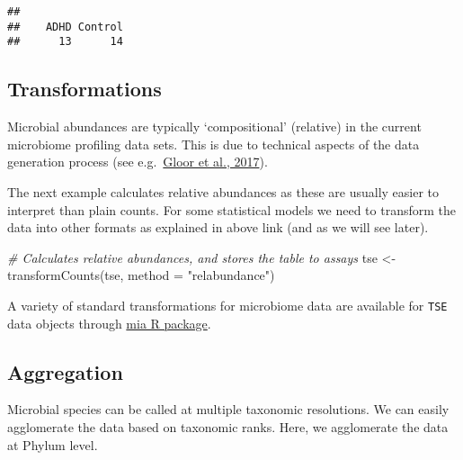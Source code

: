 \documentclass[
  oneside]{book}
\newenvironment{Shaded}{\begin{snugshade}}{\end{snugshade}}
\newcommand{\AttributeTok}[1]{\textcolor[rgb]{0.77,0.63,0.00}{#1}}
\newcommand{\CommentTok}[1]{\textcolor[rgb]{0.56,0.35,0.01}{\textit{#1}}}
\newcommand{\FunctionTok}[1]{\textcolor[rgb]{0.00,0.00,0.00}{#1}}
\newcommand{\NormalTok}[1]{#1}
\newcommand{\OtherTok}[1]{\textcolor[rgb]{0.56,0.35,0.01}{#1}}
\newcommand{\SpecialCharTok}[1]{\textcolor[rgb]{0.00,0.00,0.00}{#1}}
\newcommand{\StringTok}[1]{\textcolor[rgb]{0.31,0.60,0.02}{#1}}
\begin{document}
\begin{Shaded}
\end{Shaded}

\begin{verbatim}
## 
##    ADHD Control 
##      13      14
\end{verbatim}

\hypertarget{transformations}{%
\subsection{Transformations}\label{transformations}}

Microbial abundances are typically `compositional' (relative) in the
current microbiome profiling data sets. This is due to technical
aspects of the data generation process (see e.g.~\href{https://www.frontiersin.org/articles/10.3389/fmicb.2017.02224/full}{Gloor et al.,
2017}).

The next example calculates relative abundances as these are usually easier to
interpret than plain counts. For some statistical models we need to
transform the data into other formats as explained in above link (and
as we will see later).

\begin{Shaded}
\begin{Highlighting}[]
\CommentTok{\# Calculates relative abundances, and stores the table to assays}
\NormalTok{tse }\OtherTok{\textless{}{-}} \FunctionTok{transformCounts}\NormalTok{(tse, }\AttributeTok{method =} \StringTok{"relabundance"}\NormalTok{)}
\end{Highlighting}
\end{Shaded}

A variety of standard transformations for microbiome data are available for \texttt{TSE} data objects through \href{https://microbiome.github.io/mia/reference/transformCounts.html}{mia R package}.

\hypertarget{aggregation}{%
\subsection{Aggregation}\label{aggregation}}

Microbial species can be called at multiple taxonomic resolutions. We
can easily agglomerate the data based on taxonomic ranks. Here, we
agglomerate the data at Phylum level.
\end{document}

